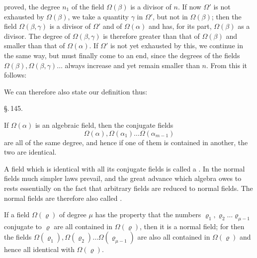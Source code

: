 proved, the degree $n_1$ of the field $\Omega(\beta)$ is a
divisor of $n$. If now $\Omega'$ is not exhausted by $\Omega(\beta)$,
we take a quantity $\gamma$ in $\Omega'$, but not in
$\Omega(\beta)$; then the field $\Omega(\beta,
\gamma)$ is a divisor of $\Omega'$ and of $\Omega(\alpha)$ and has,
for its part, $\Omega(\beta)$ as a divisor. The degree of $\Omega(\beta,
\gamma)$ is therefore greater than that of $\Omega(\beta)$ and smaller
than that of $\Omega(\alpha)$. If $\Omega'$ is not yet exhausted
by this, we continue in the same way, but must finally come to an
end, since the degrees of the fields $\Omega(\beta), \Omega(\beta,
\gamma) \ldots$ always increase and yet remain smaller than $n$.
From this it follows:


We can therefore also state our definition thus:


\begin{center}
\S.\,145.

\end{center}

If $\Omega(\alpha)$ is an algebraic field, then the
conjugate fields
\[
\Omega(\alpha), \Omega(\alpha_1) \ldots \Omega(\alpha_{m-1})
\]
are all of the same degree, and hence if one of them is contained
in another, the two are identical.

A field which is identical with all its conjugate fields
is called a . In the normal fields
much simpler laws prevail, and the great advance which
algebra owes to  rests essentially
on the fact that arbitrary fields are reduced to normal
fields. The normal fields are therefore also called .

If a field $\Omega(\varrho)$ of degree $\mu$ has the
property that the numbers $\varrho_1,
\varrho_2 \ldots \varrho_{\mu-1}$ conjugate to $\varrho$ are all
contained in $\Omega(\varrho)$, then it is a normal field; for then the
fields $\Omega(\varrho_1), \Omega(\varrho_2) \ldots
\Omega(\varrho_{\mu-1})$ are also all contained in $\Omega(\varrho)$
and hence all identical with $\Omega(\varrho)$.
